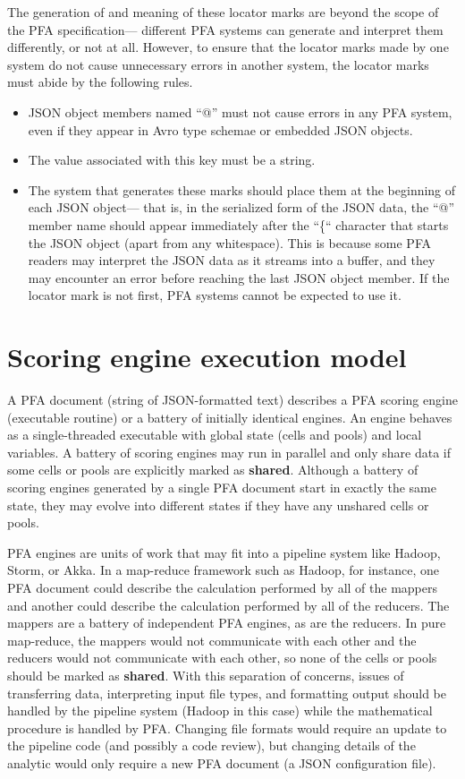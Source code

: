 \documentclass{article}
\newcommand{\PFAc}{\ttfamily\bfseries}
\theoremstyle{definition}
\begin{document}
The generation of and meaning of these locator marks are beyond the scope of the PFA specification--- different PFA systems can generate and interpret them differently, or not at all.  However, to ensure that the locator marks made by one system do not cause unnecessary errors in another system, the locator marks must abide by the following rules.
\begin{itemize}
\item JSON object members named ``@'' must not cause errors in any PFA system, even if they appear in Avro type schemae or embedded JSON objects.
\item The value associated with this key must be a string.
\item The system that generates these marks should place them at the beginning of each JSON object--- that is, in the serialized form of the JSON data, the ``@'' member name should appear immediately after the ``\{`` character that starts the JSON object (apart from any whitespace).  This is because some PFA readers may interpret the JSON data as it streams into a buffer, and they may encounter an error before reaching the last JSON object member.  If the locator mark is not first, PFA systems cannot be expected to use it.
\end{itemize}

\pagebreak

\section{Scoring engine execution model}

A PFA document (string of JSON-formatted text) describes a PFA scoring engine (executable routine) or a battery of initially identical engines.  An engine behaves as a single-threaded executable with global state (cells and pools) and local variables.  A battery of scoring engines may run in parallel and only share data if some cells or pools are explicitly marked as {\PFAc shared}.  Although a battery of scoring engines generated by a single PFA document start in exactly the same state, they may evolve into different states if they have any unshared cells or pools.

PFA engines are units of work that may fit into a pipeline system like Hadoop, Storm, or Akka.  In a map-reduce framework such as Hadoop, for instance, one PFA document could describe the calculation performed by all of the mappers and another could describe the calculation performed by all of the reducers.  The mappers are a battery of independent PFA engines, as are the reducers.  In pure map-reduce, the mappers would not communicate with each other and the reducers would not communicate with each other, so none of the cells or pools should be marked as {\PFAc shared}.  With this separation of concerns, issues of transferring data, interpreting input file types, and formatting output should be handled by the pipeline system (Hadoop in this case) while the mathematical procedure is handled by PFA.  Changing file formats would require an update to the pipeline code (and possibly a code review), but changing details of the analytic would only require a new PFA document (a JSON configuration file).
\end{document}
